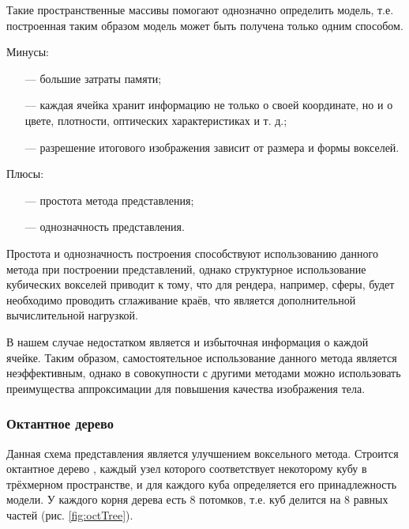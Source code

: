 Такие пространственные массивы помогают однозначно определить модель, т.е. построенная таким образом модель может быть получена только одним способом. 

Минусы:
\begin{itemize}[leftmargin=1.6\parindent]
	\item[---] большие затраты памяти;
	\item[---] каждая ячейка хранит информацию не только о своей координате, но и о цвете, плотности, оптических характеристиках и т. д.;
	\item[---] разрешение итогового изображения зависит от размера и формы вокселей.
\end{itemize}

Плюсы:
\begin{itemize}[leftmargin=1.6\parindent]
	\item[---] простота метода представления;
	\item[---] однозначность представления.
\end{itemize}

Простота и однозначность построения способствуют использованию 
данного метода при построении представлений, однако структурное 
использование кубических вокселей приводит к тому, что для рендера, например, сферы, будет необходимо проводить сглаживание краёв, что 
является дополнительной вычислительной нагрузкой.

В нашем случае недостатком является и избыточная информация о 
каждой ячейке.
Таким образом, самостоятельное использование данного метода 
является неэффективным, однако в совокупности с другими методами можно 
использовать преимущества аппроксимации для повышения качества 
изображения тела.

\subsubsection{Октантное дерево}

Данная схема представления является улучшением воксельного метода. 
Строится октантное дерево \cite{numeric-octree}, каждый узел которого соответствует некоторому 
кубу в трёхмерном пространстве, и для каждого куба определяется его 
принадлежность модели.
У каждого корня дерева есть 8 потомков, т.е. куб 
делится на 8 равных частей (рис. \ref{fig:octTree}).
\newpage

